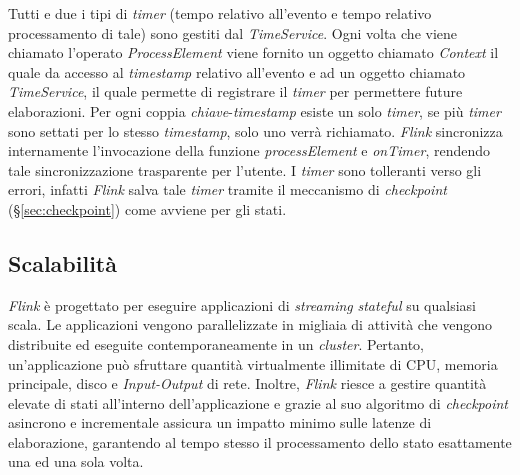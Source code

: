 \label{sec:timer}
Tutti e due i tipi di \textit{timer} (tempo relativo all'evento e tempo relativo processamento di tale) sono gestiti dal \textit{TimeService}. Ogni volta che viene chiamato l'operato \textit{ProcessElement} viene fornito un oggetto chiamato \textit{Context} il quale da accesso al \textit{\gls{timestamp}} relativo all'evento e ad un oggetto chiamato \textit{TimeService}, il quale permette di registrare il \textit{timer} per permettere future elaborazioni. Per ogni coppia \textit{chiave}-\textit{\gls{timestamp}} esiste un solo \textit{timer}, se più \textit{timer} sono settati per lo stesso \textit{\gls{timestamp}}, solo uno verrà richiamato. \textit{Flink} sincronizza internamente l'invocazione della funzione \textit{processElement} e \textit{onTimer}, rendendo tale sincronizzazione trasparente per l'utente. I \textit{timer} sono tolleranti verso gli errori, infatti \textit{Flink} salva tale \textit{timer} tramite il meccanismo di \textit{checkpoint} (\S\ref{sec:checkpoint}) come avviene per gli stati.


\subsection{Scalabilità}
\textit{Flink} è progettato per eseguire applicazioni di \textit{streaming} \textit{\gls{stateful}} su qualsiasi scala. Le applicazioni vengono parallelizzate in migliaia di attività che vengono distribuite ed eseguite contemporaneamente in un \textit{\gls{cluster}}. Pertanto, un'applicazione può sfruttare quantità virtualmente illimitate di CPU, memoria principale, disco e \textit{Input-Output} di rete. Inoltre, \textit{Flink} riesce a gestire quantità elevate di stati all'interno dell'applicazione e grazie al suo algoritmo di \textit{checkpoint} asincrono e incrementale assicura un impatto minimo sulle latenze di elaborazione, garantendo al tempo stesso il processamento dello stato esattamente una ed una sola volta.

